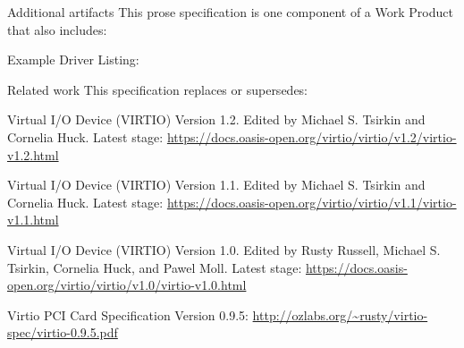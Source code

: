 \begin{titlepage}
\begin{oasistitlesection}{Additional artifacts}
This prose specification is one component of a Work Product that also includes:
\begin{itemize*}
	\item Example Driver Listing: \newline
	\virtiourllistings
\end{itemize*}
\end{oasistitlesection}
\vspace{-0.2in}

\begin{oasistitlesection}{Related work}
This specification replaces or supersedes:
\begin{itemize*}
	\item Virtual I/O Device (VIRTIO) Version 1.2. Edited by Michael S. Tsirkin and Cornelia Huck. Latest stage:\newline
	\url{https://docs.oasis-open.org/virtio/virtio/v1.2/virtio-v1.2.html}
	\item Virtual I/O Device (VIRTIO) Version 1.1. Edited by Michael S. Tsirkin and Cornelia Huck. Latest stage:\newline
	\url{https://docs.oasis-open.org/virtio/virtio/v1.1/virtio-v1.1.html}
	\item Virtual I/O Device (VIRTIO) Version 1.0. Edited by Rusty Russell, Michael S. Tsirkin, Cornelia Huck, and Pawel
 Moll. Latest stage:\newline
	\url{https://docs.oasis-open.org/virtio/virtio/v1.0/virtio-v1.0.html}
	\item Virtio PCI Card Specification Version 0.9.5:\newline
	\url{http://ozlabs.org/~rusty/virtio-spec/virtio-0.9.5.pdf}
\end{itemize*}
\end{oasistitlesection}
\vspace{-0.2in}

\vfill\newpage


\end{titlepage}
